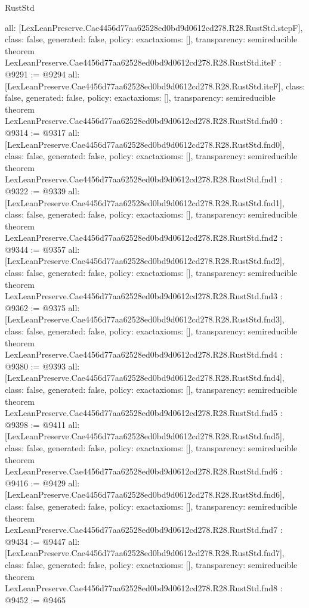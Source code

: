 \begin{lexlean}{RustStd}
\begin{coremodule}
{  all: [LexLeanPreserve.Cae4456d77aa62528ed0bd9d0612cd278.R28.RustStd.stepF],
  class: false,
  generated: false,
  policy: exact{axioms: []},
  transparency: semireducible
}
theorem LexLeanPreserve.Cae4456d77aa62528ed0bd9d0612cd278.R28.RustStd.iteF : @9291 := @9294 {
  all: [LexLeanPreserve.Cae4456d77aa62528ed0bd9d0612cd278.R28.RustStd.iteF],
  class: false,
  generated: false,
  policy: exact{axioms: []},
  transparency: semireducible
}
theorem LexLeanPreserve.Cae4456d77aa62528ed0bd9d0612cd278.R28.RustStd.fnd0 : @9314 := @9317 {
  all: [LexLeanPreserve.Cae4456d77aa62528ed0bd9d0612cd278.R28.RustStd.fnd0],
  class: false,
  generated: false,
  policy: exact{axioms: []},
  transparency: semireducible
}
theorem LexLeanPreserve.Cae4456d77aa62528ed0bd9d0612cd278.R28.RustStd.fnd1 : @9322 := @9339 {
  all: [LexLeanPreserve.Cae4456d77aa62528ed0bd9d0612cd278.R28.RustStd.fnd1],
  class: false,
  generated: false,
  policy: exact{axioms: []},
  transparency: semireducible
}
theorem LexLeanPreserve.Cae4456d77aa62528ed0bd9d0612cd278.R28.RustStd.fnd2 : @9344 := @9357 {
  all: [LexLeanPreserve.Cae4456d77aa62528ed0bd9d0612cd278.R28.RustStd.fnd2],
  class: false,
  generated: false,
  policy: exact{axioms: []},
  transparency: semireducible
}
theorem LexLeanPreserve.Cae4456d77aa62528ed0bd9d0612cd278.R28.RustStd.fnd3 : @9362 := @9375 {
  all: [LexLeanPreserve.Cae4456d77aa62528ed0bd9d0612cd278.R28.RustStd.fnd3],
  class: false,
  generated: false,
  policy: exact{axioms: []},
  transparency: semireducible
}
theorem LexLeanPreserve.Cae4456d77aa62528ed0bd9d0612cd278.R28.RustStd.fnd4 : @9380 := @9393 {
  all: [LexLeanPreserve.Cae4456d77aa62528ed0bd9d0612cd278.R28.RustStd.fnd4],
  class: false,
  generated: false,
  policy: exact{axioms: []},
  transparency: semireducible
}
theorem LexLeanPreserve.Cae4456d77aa62528ed0bd9d0612cd278.R28.RustStd.fnd5 : @9398 := @9411 {
  all: [LexLeanPreserve.Cae4456d77aa62528ed0bd9d0612cd278.R28.RustStd.fnd5],
  class: false,
  generated: false,
  policy: exact{axioms: []},
  transparency: semireducible
}
theorem LexLeanPreserve.Cae4456d77aa62528ed0bd9d0612cd278.R28.RustStd.fnd6 : @9416 := @9429 {
  all: [LexLeanPreserve.Cae4456d77aa62528ed0bd9d0612cd278.R28.RustStd.fnd6],
  class: false,
  generated: false,
  policy: exact{axioms: []},
  transparency: semireducible
}
theorem LexLeanPreserve.Cae4456d77aa62528ed0bd9d0612cd278.R28.RustStd.fnd7 : @9434 := @9447 {
  all: [LexLeanPreserve.Cae4456d77aa62528ed0bd9d0612cd278.R28.RustStd.fnd7],
  class: false,
  generated: false,
  policy: exact{axioms: []},
  transparency: semireducible
}
theorem LexLeanPreserve.Cae4456d77aa62528ed0bd9d0612cd278.R28.RustStd.fnd8 : @9452 := @9465 {
}
\end{coremodule}
\end{lexlean}
